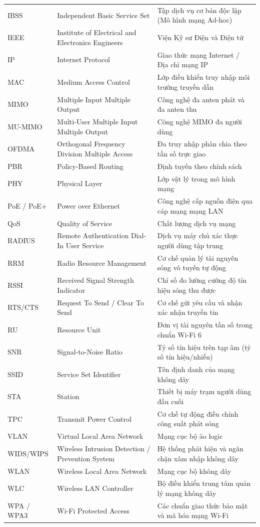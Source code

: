 \begin{xltabular}{\textwidth}{lp{4.2cm}X}
IBSS & Independent Basic Service Set & Tập dịch vụ cơ bản độc lập (Mô hình mạng Ad-hoc) \\
IEEE & Institute of Electrical and Electronics Engineers & Viện Kỹ sư Điện và Điện tử \\
IP & Internet Protocol & Giao thức mạng Internet / Địa chỉ mạng IP \\
MAC & Medium Access Control & Lớp điều khiển truy nhập môi trường truyền dẫn \\
MIMO & Multiple Input Multiple Output & Công nghệ đa anten phát và đa anten thu \\
MU-MIMO & Multi-User Multiple Input Multiple Output & Công nghệ MIMO đa người dùng \\
OFDMA & Orthogonal Frequency Division Multiple Access & Đa truy nhập phân chia theo tần số trực giao \\
PBR & Policy-Based Routing & Định tuyến theo chính sách \\
PHY & Physical Layer & Lớp vật lý trong mô hình mạng \\
PoE / PoE+ & Power over Ethernet & Công nghệ cấp nguồn điện qua cáp mạng mạng LAN \\
QoS & Quality of Service & Chất lượng dịch vụ mạng \\
RADIUS & Remote Authentication Dial-In User Service & Dịch vụ máy chủ xác thực người dùng tập trung \\
RRM & Radio Resource Management & Cơ chế quản lý tài nguyên sóng vô tuyến tự động \\
RSSI & Received Signal Strength Indicator & Chỉ số đo lường cường độ tín hiệu sóng thu được \\
RTS/CTS & Request To Send / Clear To Send & Cơ chế gửi yêu cầu và nhận xác nhận truyền tin \\
RU & Resource Unit & Đơn vị tài nguyên tần số trong chuẩn Wi-Fi 6 \\
SNR & Signal-to-Noise Ratio & Tỷ số tín hiệu trên tạp âm (tỷ số tín hiệu/nhiễu) \\
SSID & Service Set Identifier & Tên định danh của mạng không dây \\
STA & Station & Thiết bị máy trạm người dùng đầu cuối \\
TPC & Transmit Power Control & Cơ chế tự động điều chỉnh công suất phát sóng \\
VLAN & Virtual Local Area Network & Mạng cục bộ ảo logic \\
WIDS/WIPS & Wireless Intrusion Detection / Prevention System & Hệ thống phát hiện và ngăn chặn xâm nhập không dây \\
WLAN & Wireless Local Area Network & Mạng cục bộ không dây \\
WLC & Wireless LAN Controller & Bộ điều khiển trung tâm quản lý mạng không dây \\
WPA / WPA3 & Wi-Fi Protected Access & Các chuẩn giao thức bảo mật và mã hóa mạng Wi-Fi \\

\end{xltabular}
